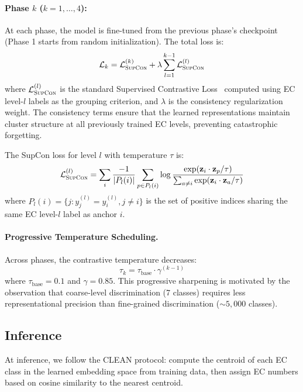 \documentclass{article}
\newcommand{\supcon}{\textsc{SupCon}}
\newcommand{\loss}{\mathcal{L}}
\begin{document}
\paragraph{Phase $k$ ($k = 1, \dots, 4$):} At each phase, the model is fine-tuned from the previous phase's checkpoint (Phase 1 starts from random initialization). The total loss is:
\begin{equation}\label{eq:loss}
    \loss_k = \loss_{\supcon}^{(k)} + \lambda \sum_{l=1}^{k-1} \loss_{\supcon}^{(l)}
\end{equation}
where $\loss_{\supcon}^{(l)}$ is the standard Supervised Contrastive Loss~\citep{khosla2020supervised} computed using EC level-$l$ labels as the grouping criterion, and $\lambda$ is the consistency regularization weight. The consistency terms ensure that the learned representations maintain cluster structure at all previously trained EC levels, preventing catastrophic forgetting.

The SupCon loss for level $l$ with temperature $\tau$ is:
\begin{equation}
    \loss_{\supcon}^{(l)} = \sum_{i} \frac{-1}{|P_l(i)|} \sum_{p \in P_l(i)} \log \frac{\exp(\mathbf{z}_i \cdot \mathbf{z}_p / \tau)}{\sum_{a \neq i} \exp(\mathbf{z}_i \cdot \mathbf{z}_a / \tau)}
\end{equation}
where $P_l(i) = \{j : y_j^{(l)} = y_i^{(l)}, j \neq i\}$ is the set of positive indices sharing the same EC level-$l$ label as anchor $i$.

\paragraph{Progressive Temperature Scheduling.}
Across phases, the contrastive temperature decreases:
\begin{equation}
    \tau_k = \tau_{\text{base}} \cdot \gamma^{(k-1)}
\end{equation}
where $\tau_{\text{base}} = 0.1$ and $\gamma = 0.85$. This progressive sharpening is motivated by the observation that coarse-level discrimination (7 classes) requires less representational precision than fine-grained discrimination (${\sim}5{,}000$ classes).

\subsection{Inference}

At inference, we follow the CLEAN protocol: compute the centroid of each EC class in the learned embedding space from training data, then assign EC numbers based on cosine similarity to the nearest centroid.
\end{document}
